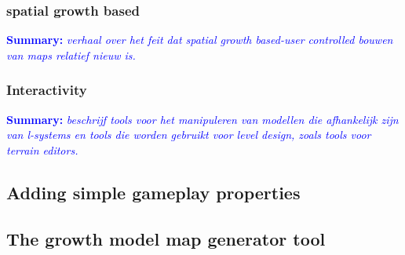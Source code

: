 \documentclass{article}
\newcommand{\inhoud}[1]{\textcolor{blue}{\textbf{Summary: }\it{#1}}}
\begin{document}
\subsubsection{spatial growth based}
\inhoud{verhaal over het feit dat spatial growth based-user controlled bouwen van maps relatief nieuw is.}

\subsubsection{Interactivity}
\inhoud{beschrijf tools voor het manipuleren van modellen die afhankelijk zijn van l-systems en tools die worden 
	gebruikt voor level design, zoals tools voor terrain editors.}


\subsection{Adding simple gameplay properties}

\subsection{The growth model map generator tool}

\end{document}

